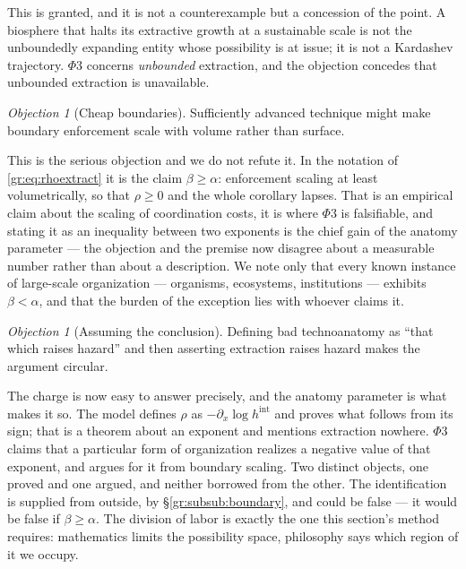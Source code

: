 \documentclass[11pt]{article}
\numberwithin{equation}{section}
\theoremstyle{plain}
\theoremstyle{definition}
\theoremstyle{remark}
\newtheorem{objection}[theorem]{Objection}
\begin{document}
\noindent This is granted, and it is not a counterexample but a
concession of the point. A biosphere that halts its extractive growth at
a sustainable scale is not the unboundedly expanding entity whose
possibility is at issue; it is not a Kardashev trajectory. $\Phi3$
concerns \emph{unbounded} extraction, and the objection concedes that
unbounded extraction is unavailable.

\begin{objection}[Cheap boundaries]\label{gr:obj:cheap}
Sufficiently advanced technique might make boundary enforcement scale
with volume rather than surface.
\end{objection}

\noindent This is the serious objection and we do not refute it. In the
notation of \eqref{gr:eq:rhoextract} it is the claim $\beta\ge\alpha$:
enforcement scaling at least volumetrically, so that $\rho\ge0$ and the
whole corollary lapses. That is an empirical claim about the scaling of
coordination costs, it is where $\Phi3$ is falsifiable, and stating it
as an inequality between two exponents is the chief gain of the anatomy
parameter --- the objection and the premise now disagree about a
measurable number rather than about a description. We note only that
every known instance of large-scale organization --- organisms,
ecosystems, institutions --- exhibits $\beta<\alpha$, and that the
burden of the exception lies with whoever claims it.

\begin{objection}[Assuming the conclusion]\label{gr:obj:circular}
Defining bad technoanatomy as ``that which raises hazard'' and then
asserting extraction raises hazard makes the argument circular.
\end{objection}

\noindent The charge is now easy to answer precisely, and the anatomy
parameter is what makes it so. The model defines $\rho$ as
$-\partial_x\log h^{\mathrm{int}}$ and proves what follows from its
sign; that is a theorem about an exponent and mentions extraction
nowhere. $\Phi3$ claims that a particular form of organization realizes
a negative value of that exponent, and argues for it from boundary
scaling. Two distinct objects, one proved and one argued, and neither
borrowed from the other. The identification is supplied from outside,
by \S\ref{gr:subsub:boundary}, and could be false --- it would be false
if $\beta\ge\alpha$. The division of labor is exactly the one this section's method
requires: mathematics limits the possibility space, philosophy says
which region of it we occupy.
\end{document}
